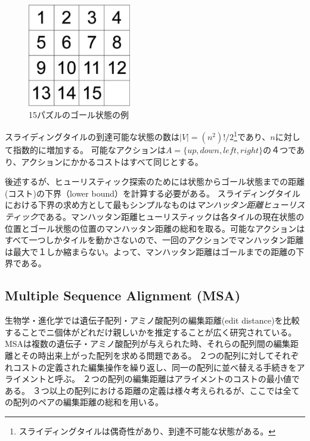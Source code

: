 \documentclass{report}
\begin{document}
\begin{figure}
\centering
\includegraphics[width=0.4\textwidth]{figures/15-puzzle.pdf}
\caption{15パズルのゴール状態の例}
\label{fig:15-puzzle}
\end{figure}

スライディングタイルの到達可能な状態の数は$|V| = (n^2)!/2$\footnote{スライディングタイルは偶奇性があり、到達不可能な状態がある\cite{TODO}。}であり、$n$に対して指数的に増加する。
可能なアクションは$A= \{up, down, left, right\}$の４つであり、アクションにかかるコストはすべて同じとする。

後述するが、ヒューリスティック探索のためには状態からゴール状態までの距離(コスト)の下界（lower bound）を計算する必要がある。
スライディングタイルにおける下界の求め方として最もシンプルなものは{\it マンハッタン距離ヒューリスティック}である。マンハッタン距離ヒューリスティックは各タイルの現在状態の位置とゴール状態の位置のマンハッタン距離の総和を取る。可能なアクションはすべて一つしかタイルを動かさないので、一回のアクションでマンハッタン距離は最大で１しか縮まらない。よって、マンハッタン距離はゴールまでの距離の下界である。


\subsection{Multiple Sequence Alignment (MSA)}

生物学・進化学では遺伝子配列・アミノ酸配列の編集距離(edit distance)を比較することでニ個体がどれだけ親しいかを推定することが広く研究されている。
MSAは複数の遺伝子・アミノ酸配列が与えられた時、それらの配列間の編集距離とその時出来上がった配列を求める問題である。
２つの配列に対してそれぞれコストの定義された編集操作を繰り返し、同一の配列に並べ替える手続きをアライメントと呼ぶ。
２つの配列の編集距離はアライメントのコストの最小値である。
３つ以上の配列における距離の定義は様々考えられるが、ここでは全ての配列のペアの編集距離の総和を用いる。
\end{document}
